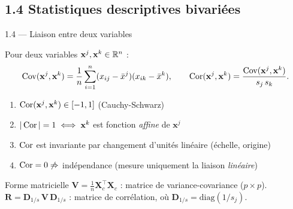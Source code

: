 \subsection{1.4 Statistiques descriptives bivariées}
\begin{frame}{1.4 — Liaison entre deux variables}
\begin{definition}
Pour deux variables $\mathbf{x}^j, \mathbf{x}^k \in \mathbb{R}^n$ :
\[
\operatorname{Cov}(\mathbf{x}^j, \mathbf{x}^k)
= \frac{1}{n}\sum_{i=1}^n (x_{ij}-\bar{x}^j)(x_{ik}-\bar{x}^k),
\qquad
\operatorname{Cor}(\mathbf{x}^j, \mathbf{x}^k) = \frac{\operatorname{Cov}(\mathbf{x}^j, \mathbf{x}^k)}{s_j \, s_k}.
\]
\end{definition}

\begin{prop}
\begin{enumerate}
  \item $\operatorname{Cor}(\mathbf{x}^j, \mathbf{x}^k) \in [-1, 1]$ \hfill (Cauchy-Schwarz)
  \item $|\operatorname{Cor}| = 1 \iff \mathbf{x}^k$ est fonction \emph{affine} de $\mathbf{x}^j$
  \item $\operatorname{Cor}$ est invariante par changement d'unités linéaire (échelle, origine)
  \item $\operatorname{Cor} = 0 \not\Rightarrow$ indépendance (mesure uniquement la liaison \emph{linéaire})
\end{enumerate}
\end{prop}

\vspace{0.1cm}
\begin{block}{Forme matricielle}
$\mathbf{V} = \frac{1}{n} \mathbf{X}_c^\top \mathbf{X}_c$ : matrice de variance-covariance ($p\times p$).\\
$\mathbf{R} = \mathbf{D}_{1/s}\, \mathbf{V}\, \mathbf{D}_{1/s}$ : matrice de corrélation, où $\mathbf{D}_{1/s} = \text{diag}(1/s_j)$.
\end{block}
\end{frame}

